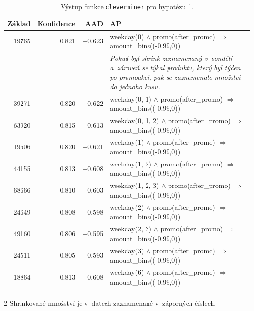     \begin{center}
    \begin{table}[h!]
        \captionsetup{justification=centering}

        \begin{threeparttable}
        \caption{Výstup funkce \texttt{cleverminer} pro hypotézu 1.}
        \begin{tabular}{rrrp{8cm}}
                Základ & Konfidence & AAD & AP \\
            \midrule
                19765 & 0.821 & $+0.623$ & weekday(0) $\land$ promo(after\_promo) $\Rightarrow$ amount\_bins((-0.99,0)) \\
                & & & {\footnotesize{\textit{Pokud byl shrink zaznamenaný v~pondělí a~zároveň se týkal produktu, který byl týden po promoakci, pak se zaznamenalo množství do jednoho kusu\tnote{2}. }}} \\
                39271 & 0.820 & +0.622 & weekday(0, 1)  $\land$ promo(after\_promo) $\Rightarrow$ amount\_bins((-0.99,0)) \\
                63920 & 0.815 & +0.613 & weekday(0, 1, 2)  $\land$ promo(after\_promo) $\Rightarrow$ amount\_bins((-0.99,0)) \\
                19506 & 0.820 & +0.621 & weekday(1)  $\land$ promo(after\_promo) $\Rightarrow$ amount\_bins((-0.99,0)) \\
                44155 & 0.813 & +0.608 & weekday(1, 2)  $\land$ promo(after\_promo) $\Rightarrow$ amount\_bins((-0.99,0)) \\
                68666 & 0.810 & +0.603 & weekday(1, 2, 3)  $\land$ promo(after\_promo) $\Rightarrow$ amount\_bins((-0.99,0)) \\
                24649 & 0.808 & +0.598 & weekday(2)  $\land$ promo(after\_promo) $\Rightarrow$ amount\_bins((-0.99,0)) \\
                49160 & 0.806 & +0.595 & weekday(2, 3)  $\land$ promo(after\_promo) $\Rightarrow$ amount\_bins((-0.99,0)) \\
                24511 & 0.805 & +0.593 &weekday(3) $\land$ promo(after\_promo) $\Rightarrow$ amount\_bins((-0.99,0)) \\
                18864 & 0.813 & +0.608 &weekday(6)  $\land$ promo(after\_promo) $\Rightarrow$ amount\_bins((-0.99,0)) \\
                \bottomrule
                \vspace*{-2em}
\label{tab:H1vysl}
        \end{tabular}
    \begin{tablenotes}
    \item[2] {\footnotesize{Shrinkované množství je v~datech zaznamenané v~záporných číslech.}}
    \end{tablenotes}
\end{threeparttable}
\end{table}
\end{center}


